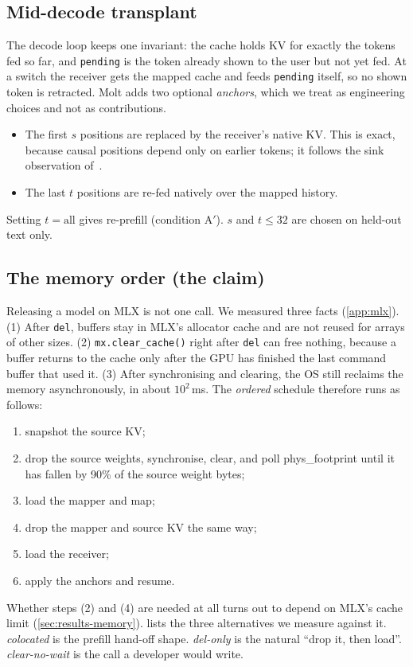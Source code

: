 \subsection{Mid-decode transplant}\label{sec:transplant}
The decode loop keeps one invariant: the cache holds KV for exactly the tokens fed so far, and \texttt{pending} is the token already shown to the user but not yet fed.
At a switch the receiver gets the mapped cache and feeds \texttt{pending} itself, so no shown token is retracted.
Molt adds two optional \emph{anchors}, which we treat as engineering choices and not as contributions.
\begin{itemize}
\item The first $s$ positions are replaced by the receiver's native KV. This is exact, because causal positions depend only on earlier tokens; it follows the sink observation of~\citep{xiao2023streamingllm}.
\item The last $t$ positions are re-fed natively over the mapped history.
\end{itemize}
Setting $t=\text{all}$ gives re-prefill (condition A$'$).
$s$ and $t\le 32$ are chosen on held-out text only.

\subsection{The memory order (the claim)}\label{sec:order}
Releasing a model on MLX is not one call.
We measured three facts (\cref{app:mlx}).
(1) After \texttt{del}, buffers stay in MLX's allocator cache and are not reused for arrays of other sizes.
(2) \texttt{mx.clear\_cache()} right after \texttt{del} can free nothing, because a buffer returns to the cache only after the GPU has finished the last command buffer that used it.
(3) After synchronising and clearing, the OS still reclaims the memory asynchronously, in about $10^2$\,ms.
The \emph{ordered} schedule therefore runs as follows:
\begin{enumerate}
\item snapshot the source KV;
\item drop the source weights, synchronise, clear, and poll phys\_footprint until it has fallen by 90\% of the source weight bytes;
\item load the mapper and map;
\item drop the mapper and source KV the same way;
\item load the receiver;
\item apply the anchors and resume.
\end{enumerate}
Whether steps (2) and (4) are needed at all turns out to depend on MLX's cache limit (\cref{sec:results-memory}).
 lists the three alternatives we measure against it.
\emph{colocated} is the prefill hand-off shape.
\emph{del-only} is the natural ``drop it, then load''.
\emph{clear-no-wait} is the call a developer would write.

